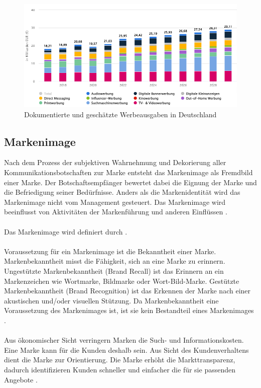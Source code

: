 \begin{figure}[H]
    \centering
    \includegraphics[width=0.90\linewidth]{images/werbede.png}
    \caption{Dokumentierte und geschätzte Werbeausgaben in Deutschland \cite{statista_werbung}}
    \label{fig:statistawerbungde}
\end{figure}
\subsection{Markenimage}
\label{markenimage}
Nach dem Prozess der subjektiven Wahrnehmung und Dekorierung aller Kommunikationsbotschaften zur Marke entsteht das Markenimage als Fremdbild einer Marke. Der Botschaftsempfänger bewertet dabei die Eignung der Marke und die Befriedigung seiner Bedürfnisse. Anders als die Markenidentität wird das Markenimage nicht vom Management gesteuert. Das Markenimage wird beeinflusst von Aktivitäten der Markenführung und anderen Einflüssen \cite{burmann2024}. \\\\
Das Markenimage wird definiert durch   \cite{burmann2024}.\\\\
Voraussetzung für ein Markenimage ist die Bekanntheit einer Marke. Markenbekanntheit misst die Fähigkeit, sich an eine Marke zu erinnern. Ungestützte Markenbekanntheit (Brand Recall) ist das Erinnern an ein Markenzeichen wie Wortmarke, Bildmarke oder Wort-Bild-Marke. Gestützte Markenbekanntheit (Brand Recognition) ist das Erkennen der Marke nach einer akustischen und/oder visuellen Stützung. Da Markenbekanntheit eine Voraussetzung des Markenimages ist, ist sie kein Bestandteil eines Markenimages \cite{burmann2024}. \\\\
Aus ökonomischer Sicht verringern Marken die Such- und Informationskosten. Eine Marke kann für die Kunden deshalb  sein. Aus Sicht des Kundenverhaltens dient die Marke zur Orientierung. Die Marke erhöht die Markttransparenz, dadurch identifizieren Kunden schneller und einfacher die für sie passenden Angebote \cite{burmann2024}.  
